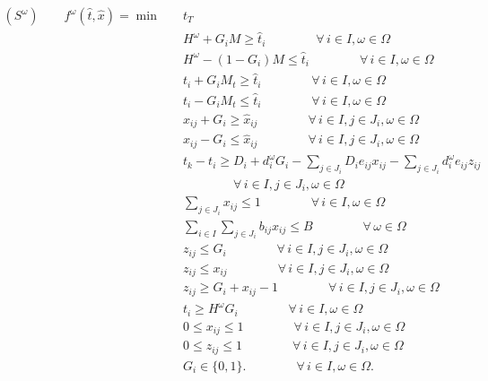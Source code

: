 \documentclass[11pt]{article}
\begin{document}
	\begin{subequations}
		\label{prob:subOri}
		\begin{align}
		(S^\omega) \qquad f^\omega(\hat{t},\hat{x}) = \min \quad & t_T \\
		& H^\omega + G_i M \geq \hat{t}_i \qquad \qquad \forall \,i \in I, \omega \in \Omega \label{cons:sG1}\\
		& H^\omega - (1 - G_i) M \leq \hat{t}_i \qquad \qquad \forall \,i \in I, \omega \in \Omega \label{cons:sG2}\\
		& t_i + G_i M_t \geq \hat{t}_i \qquad \qquad \forall \,i \in I, \omega \in \Omega \label{cons:stG1}\\
		& t_i - G_i M_t \leq \hat{t}_i \qquad \qquad \forall \,i \in I, \omega \in \Omega \label{cons:stG2}\\
		& x_{ij} + G_i \geq \hat{x}_{ij} \qquad \qquad \forall \,i \in I, j \in J_i, \omega \in \Omega \label{cons:sxG1}\\
		& x_{ij} - G_i \leq \hat{x}_{ij} \qquad \qquad \forall \,i \in I, j \in J_i, \omega \in \Omega \label{cons:sxG2}\\
		& t_k - t_i \geq D_i + d_i^\omega G_i -\sum_{j \in J_i} D_i e_{ij} x_{ij} - \sum_{j \in J_i} d_i^\omega e_{ij} z_{ij} \nonumber \\ 
		& \qquad \qquad \forall \,i \in I, j \in J_i, \omega \in \Omega \label{cons:subSep}\\
		& \sum_{j \in J_i} x_{ij} \leq 1 \qquad \qquad \forall \,i \in I, \omega \in \Omega \label{cons:subBudget1}\\
		& \sum_{i \in I}\sum_{j \in J_i} b_{ij}x_{ij} \leq B \qquad \qquad \forall \,\omega \in \Omega \label{cons:subBudget}\\
		& z_{ij} \leq G_i \qquad \qquad \forall \,i \in I, j \in J_i, \omega \in \Omega \label{cons:sublinearize1}\\
		& z_{ij} \leq x_{ij} \qquad \qquad \forall \,i \in I, j \in J_i, \omega \in \Omega \label{cons:sublinearize2}\\
		& z_{ij} \geq G_i + x_{ij} - 1 \qquad \qquad \forall \,i \in I, j \in J_i, \omega \in \Omega \label{cons:sublinearize3}\\
		& t_i \geq H^\omega G_i \qquad \qquad \forall\, i \in I, \omega \in \Omega \\
		& 0 \leq x_{ij} \leq 1 \qquad \qquad \forall \,i \in I, j \in J_i, \omega \in \Omega\\
		& 0 \leq z_{ij} \leq 1 \qquad \qquad \forall \,i \in I, j \in J_i, \omega \in \Omega\\
		& G_i \in \{0,1\}. \qquad \qquad \forall \,i \in I, \omega \in \Omega. \label{cons:subInt}
		\end{align}
	\end{subequations}
\end{document}
